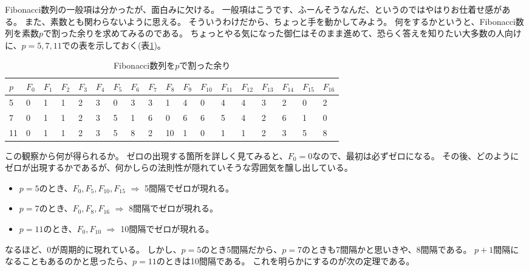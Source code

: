 Fibonacci数列の一般項は分かったが、面白みに欠ける。
一般項はこうです、ふーんそうなんだ、というのではやはりお仕着せ感がある。
また、素数とも関わらないように思える。
そういうわけだから、ちょっと手を動かしてみよう。
何をするかというと、Fibonacci数列を素数$p$で割った余りを求めてみるのである。
ちょっとやる気になった御仁はそのまま進めて、恐らく答えを知りたい大多数の人向けに、$p=5,7,11$での表を示しておく(表\ref{table:fibonacci_example})。

\begin{table}[htb]\label{table:fibonacci_example}
 \begin{center}
    \caption{Fibonacci数列を$p$で割った余り}
  \begin{tabular}{|l|l|l|l|l|l|l|l|l|l|l|l|l|l|l|l|l|l|}\hline
    $p$ & $F_0$ & $F_1$ & $F_2$ & $F_3$ & $F_4$ & $F_5$ & $F_6$ & $F_7$ & $F_8$ & $F_9$ & $F_{10}$ & $F_{11}$ & $F_{12}$ & $F_{13}$ & $F_{14}$ & $F_{15}$ & $F_{16}$ \\ \hline\hline
    5   & 0     & 1     & 1     & 2     & 3     & 0     & 3     & 3     & 1     & 4     & 0        & 4        & 4        & 3        & 2        & 0        & 2        \\ \hline
    7   & 0     & 1     & 1     & 2     & 3     & 5     & 1     & 6     & 0     & 6     & 6        & 5        & 4        & 2        & 6        & 1        & 0        \\ \hline
    11  & 0     & 1     & 1     & 2     & 3     & 5     & 8     & 2     & 10    & 1     & 0        & 1        & 1        & 2        & 3        & 5        & 8        \\ \hline
  \end{tabular}
  \end{center}
\end{table}

この観察から何が得られるか。
ゼロの出現する箇所を詳しく見てみると、$F_0=0$なので、最初は必ずゼロになる。
その後、どのようにゼロが出現するかであるが、何かしらの法則性が隠れていそうな雰囲気を醸し出している。
\begin{itemize}
 \item $p = 5$のとき、$F_0, F_5, F_{10}, F_{15}$ $\Rightarrow$ 5間隔でゼロが現れる。
 \item $p = 7$のとき、$F_0, F_8, F_{16}$ $\Rightarrow$ 8間隔でゼロが現れる。
 \item $p = 11$のとき、$F_0, F_{10}$ $\Rightarrow$ 10間隔でゼロが現れる。
\end{itemize}

なるほど、0が周期的に現れている。
しかし、$p=5$のとき5間隔だから、$p=7$のときも7間隔かと思いきや、8間隔である。
$p+1$間隔になることもあるのかと思ったら、$p=11$のときは10間隔である。
これを明らかにするのが次の定理である。

